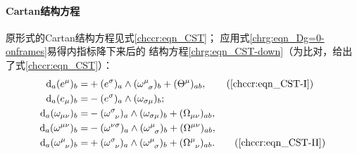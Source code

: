 \paragraph{Cartan结构方程}
原形式的Cartan结构方程见式\eqref{chccr:eqn_CST}；
应用式\eqref{chrg:eqn_Dg=0-onframes}易得内指标降下来后的
结构方程\eqref{chrg:eqn_CST-down}（为比对，给出了式\eqref{chccr:eqn_CST}）：
\begin{subequations}\label{chrg:eqn_CST-down}
    \begin{align}
    	{\rm d}_a (e^\mu)_b =& +(e^\sigma)_a \wedge (\omega _{\hphantom{\mu} \sigma}^\mu)_b +(\Theta ^{\mu})_{ab}, 
    	   \tag{\ref{chccr:eqn_CST-I}} \\
        {\rm d}_a (e_\mu)_b =&- (e^\sigma)_a \wedge (\omega_{\sigma \mu})_b  ; \label{chrg:eqn_CST-down-I} \\
        {\rm d}_a (\omega _{\mu\nu})_b  =& -(\omega _{\hphantom{\sigma} \nu} ^\sigma)_a \wedge (\omega_{\sigma \mu})_b
          + (\Omega_{\mu \nu})_{ab}  , \label{chrg:eqn_CST-down-II} \\
        {\rm d}_a (\omega^{\mu\nu})_b = &  -(\omega^{\nu\sigma})_a\wedge (\omega_{\hphantom{\mu}\sigma}^\mu  )_b
          + (\Omega^{\mu\nu})_{ab} , \label{chrg:eqn_CST-down-III} \\
        {\rm d}_a ( \omega _{\hphantom{\mu} \nu} ^\mu  )_b  =&  +( \omega _{\hphantom{\mu} \nu}^\sigma )_a
          \wedge ( \omega _{\hphantom{\mu} \sigma}^\mu )_b + (\Omega_{\hphantom{\mu} \nu} ^{\mu})_{ab} . 
             \tag{\ref{chccr:eqn_CST-II}}
    \end{align}
\end{subequations}

